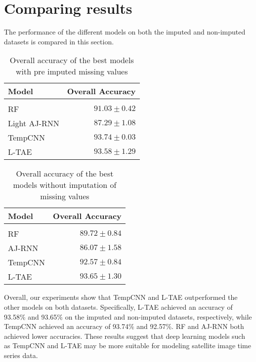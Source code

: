 
\pagebreak

\pagebreak

\pagebreak

\pagebreak

\section{Comparing results}

The performance of the different models on both the imputed and non-imputed datasets is compared in this section.

\begin{table}[H]
  \centering
    \begin{tabular}{lr}
    Model                       & Overall Accuracy             \\[0.2cm] 
    \hline \\[-0.2cm]
    RF            & $91.03 \pm 0.42$\\
    Light AJ-RNN  & $87.29 \pm 1.08$\\
    TempCNN       & $93.74 \pm 0.03$\\
    L-TAE         & $93.58 \pm 1.29$
    \end{tabular}
  \caption{Overall accuracy of the best models with pre imputed missing values}
  \label{tab:ALLresultsImputed} 
\end{table}

\begin{table}[H]
  \centering
    \begin{tabular}{lr}
    Model                       & Overall Accuracy             \\[0.2cm] 
    \hline \\[-0.2cm]
    RF      & $89.72 \pm 0.84$\\
    AJ-RNN  & $86.07 \pm 1.58$\\
    TempCNN & $92.57 \pm 0.84$\\
    L-TAE   & $93.65 \pm 1.30$
    \end{tabular}
  \caption{Overall accuracy of the best models without imputation of missing values} 
  \label{tab:ALLresultsNoImputed}
\end{table}

Overall, our experiments show that TempCNN and L-TAE outperformed the other models on both datasets.
Specifically, L-TAE achieved an accuracy of 93.58\% and 93.65\% on the imputed and non-imputed datasets, respectively, 
while TempCNN achieved an accuracy of 93.74\% and 92.57\%. RF and AJ-RNN both achieved lower accuracies. 
These results suggest that deep learning models such as TempCNN and L-TAE may be more suitable for modeling satellite image time series data.

